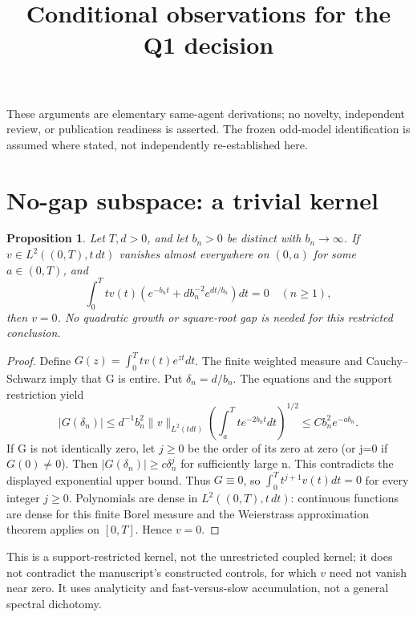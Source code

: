 \documentclass[11pt]{article}
\title{Conditional observations for the Q1 decision}
\author{}
\date{}
\newtheorem{proposition}{Proposition}
\begin{document}
\maketitle
\noindent These arguments are elementary same-agent derivations; no novelty, independent review, or publication readiness is asserted. The frozen odd-model identification is assumed where stated, not independently re-established here.

\section{No-gap subspace: a trivial kernel}
\begin{proposition}\label{prop:gap}
Let \(T,d>0\), and let \(b_n>0\) be distinct with \(b_n\to\infty\). If \(v\in L^2((0,T),t\,dt)\) vanishes almost everywhere on \((0,a)\) for some \(a\in(0,T)\), and
\[
\int_0^T t v(t)\left(e^{-b_nt}+d b_n^{-2}e^{dt/b_n}\right)dt=0\quad(n\ge1),
\]
then \(v=0\). No quadratic growth or square-root gap is needed for this restricted conclusion.
\end{proposition}
\begin{proof}
Define \(G(z)=\int_0^T t v(t)e^{zt}dt\). The finite weighted measure and Cauchy--Schwarz imply that G is entire. Put \(\delta_n=d/b_n\). The equations and the support restriction yield
\[
|G(\delta_n)|\le d^{-1}b_n^2 \|v\|_{L^2(tdt)}
 \left(\int_a^T t e^{-2b_nt}dt\right)^{1/2}
 \le C b_n^2 e^{-ab_n}.
\]
If G is not identically zero, let \(j\ge0\) be the order of its zero at zero (or j=0 if \(G(0)\ne0\)). Then \(|G(\delta_n)|\ge c\delta_n^j\) for sufficiently large n. This contradicts the displayed exponential upper bound. Thus \(G\equiv0\), so \(\int_0^T t^{j+1}v(t)dt=0\) for every integer \(j\ge0\). Polynomials are dense in \(L^2((0,T),t\,dt)\): continuous functions are dense for this finite Borel measure and the Weierstrass approximation theorem applies on \([0,T]\). Hence \(v=0\).
\end{proof}
This is a support-restricted kernel, not the unrestricted coupled kernel; it does not contradict the manuscript's constructed controls, for which \(v\) need not vanish near zero. It uses analyticity and fast-versus-slow accumulation, not a general spectral dichotomy.
\end{document}
